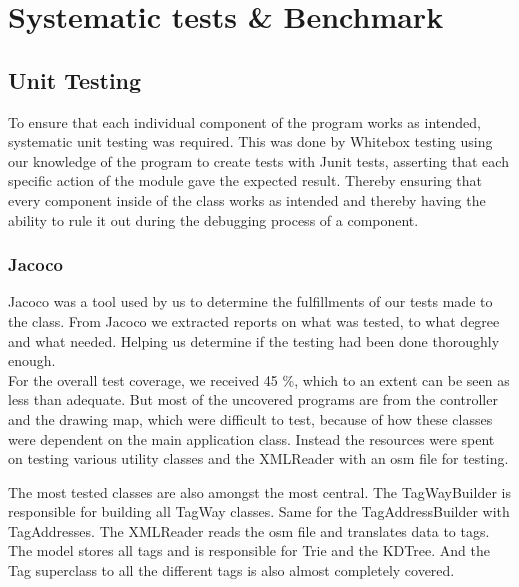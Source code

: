 \newpage
\section{Systematic tests \& Benchmark}

\subsection{Unit Testing}
To ensure that each individual component of the program works as intended, systematic unit testing was required. This was done by Whitebox \cite{testing/whiteboxtesting} testing using our knowledge of the program to create tests with Junit tests, asserting that each specific action of the module gave the expected result. Thereby ensuring that every component inside of the class works as intended and thereby having the ability to rule it out during the debugging process of a component.
\subsubsection{Jacoco}
Jacoco was a tool used by us to determine the fulfillments of our tests made to the class. From Jacoco we extracted reports on what was tested, to what degree and what needed. Helping us determine if the testing had been done thoroughly enough.\\
For the overall test coverage, we received 45 \%, which to an extent can be seen as less than adequate. But most of the uncovered programs are from the controller and the drawing map, which were difficult to test, because of how these classes were dependent on the main application class.
Instead the resources were spent on testing various utility classes and the XMLReader with an osm file for testing.\par
The most tested classes are also amongst the most central. The TagWayBuilder is responsible for building all TagWay classes. Same for the TagAddressBuilder with TagAddresses. The XMLReader reads the osm file and translates data to tags.
The model stores all tags and is responsible for Trie and the KDTree. And the Tag superclass to all the different tags is also almost completely covered.

